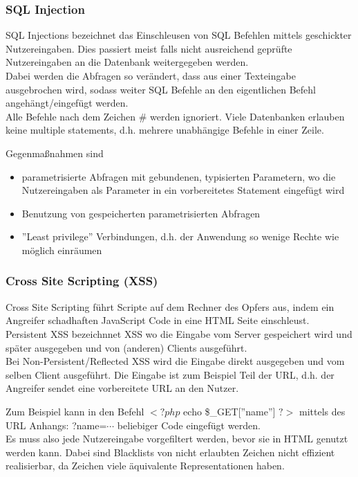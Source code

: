 \documentclass[a4paper,12pt,leqno]{article}
\begin{document}
\subsubsection{SQL Injection}

SQL Injections bezeichnet das Einschleusen von SQL Befehlen mittels geschickter Nutzereingaben. Dies passiert meist falls nicht ausreichend geprüfte Nutzereingaben an die Datenbank weitergegeben werden.\\

Dabei werden die Abfragen so verändert, dass aus einer Texteingabe ausgebrochen wird, sodass weiter SQL Befehle an den eigentlichen Befehl angehängt/eingefügt werden.\\
Alle Befehle nach dem Zeichen \# werden ignoriert. Viele Datenbanken erlauben keine multiple statements, d.h. mehrere unabhängige Befehle in einer Zeile.

Gegenmaßnahmen sind 
\begin{itemize}
\item parametrisierte Abfragen mit gebundenen, typisierten Parametern, wo die Nutzereingaben als Parameter in ein vorbereitetes Statement eingefügt wird
\item Benutzung von gespeicherten parametrisierten Abfragen
\item ''Least privilege'' Verbindungen, d.h. der Anwendung so wenige Rechte wie möglich einräumen
\end{itemize}

\subsubsection{Cross Site Scripting (XSS)}

Cross Site Scripting führt Scripte auf dem Rechner des Opfers aus, indem ein Angreifer schadhaften JavaScript Code in eine HTML Seite einschleust.\\

Persistent XSS bezeichnnet XSS wo die Eingabe vom Server gespeichert wird und später ausgegeben und von (anderen) Clients ausgeführt.\\

Bei Non-Persistent/Reflected XSS wird die Eingabe direkt ausgegeben und vom selben Client ausgeführt. Die Eingabe ist zum Beispiel Teil der URL, d.h. der Angreifer sendet eine vorbereitete URL an den Nutzer.

Zum Beispiel kann in den Befehl $<?php$ echo \$\_GET[''name''] $?>$ mittels des URL Anhangs: ?name=$\cdots$ beliebiger Code eingefügt werden.\\

Es muss also jede Nutzereingabe vorgefiltert werden, bevor sie in HTML genutzt werden kann. Dabei sind Blacklists von nicht erlaubten Zeichen nicht effizient realisierbar, da Zeichen viele äquivalente Representationen haben.
\end{document}
